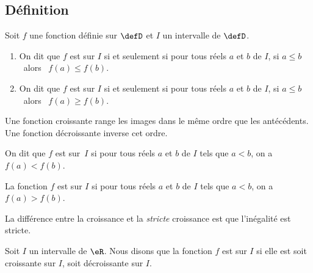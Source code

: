 \subsection{Définition}

\begin{definition}
      Soit $f$ une fonction définie sur $\defD$ et $I$ un
      intervalle de $\defD$.\\[-2ex]
      \begin{enumerate}
          \item On dit que $f$ est  sur $I$
        si et seulement si pour tous réels $a$ et $b$ de $I$, 
        si $a\leq b$ \ alors \ $f(a)\leq f(b)$.
    \item On dit que $f$ est  sur $I$
        si et seulement si pour tous réels $a$ et $b$ de $I$, 
        si $a\leq b$ \ alors \ $f(a)\geq f(b)$. 
      \end{enumerate}
\end{definition}


\begin{remark}
    Une fonction croissante range les images dans le même ordre que les antécédents. Une fonction décroissante inverse cet ordre. 
\end{remark}


\begin{definition}
    On dit que $f$ est  sur~$I$
  si pour tous réels $a$ et $b$ de $I$ tels que $a<b$, on a $f(a)<f(b)$.

  La fonction \( f\) est  sur \( I\) si pour tous réels $a$ et $b$ de $I$ tels que $a<b$, on a $f(a)>f(b)$.
\end{definition}
La différence entre la croissance et la \emph{stricte} croissance est que l'inégalité est stricte.

\begin{definition}
    Soit \( I\) un intervalle de \( \eR\). Nous disons que la fonction \( f\) est  sur $I$ si elle est soit croissante sur $I$, soit décroissante sur $I$.
\end{definition}

